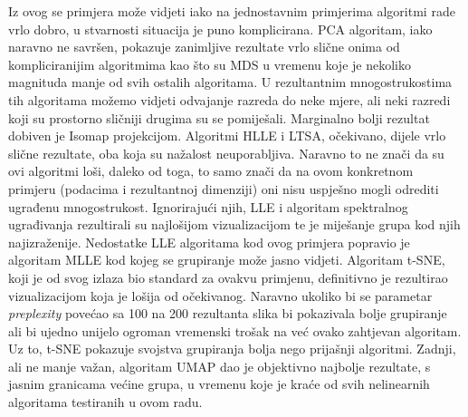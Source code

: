 \documentclass[times, utf8, diplomski]{fer}
\begin{document}
Iz ovog se primjera može vidjeti iako na jednostavnim primjerima algoritmi rade vrlo dobro, u stvarnosti situacija je puno komplicirana. PCA algoritam, iako naravno ne savršen, pokazuje zanimljive rezultate vrlo slične onima od kompliciranijim algoritmima kao što su MDS u vremenu koje je nekoliko magnituda manje od svih ostalih algoritama. U rezultantnim mnogostrukostima tih algoritama možemo vidjeti odvajanje razreda do neke mjere, ali neki razredi koji su prostorno sličniji drugima su se pomiješali. Marginalno bolji rezultat dobiven je Isomap projekcijom. Algoritmi HLLE i LTSA, očekivano, dijele vrlo slične rezultate, oba koja su nažalost neuporabljiva. Naravno to ne znači da su ovi algoritmi loši, daleko od toga, to samo znači da na ovom konkretnom primjeru (podacima i rezultantnoj dimenziji) oni nisu uspješno mogli odrediti ugrađenu mnogostrukost. Ignorirajući njih, LLE i algoritam spektralnog ugrađivanja rezultirali su najlošijom vizualizacijom te je miješanje grupa kod njih najizraženije. Nedostatke LLE algoritama kod ovog primjera popravio je algoritam MLLE kod kojeg se grupiranje može jasno vidjeti. Algoritam t-SNE, koji je od svog izlaza bio standard za ovakvu primjenu, definitivno je rezultirao vizualizacijom koja je lošija od očekivanog. Naravno ukoliko bi se parametar \emph{preplexity} povećao sa 100 na 200 rezultanta slika bi pokazivala bolje grupiranje ali bi ujedno unijelo ogroman vremenski trošak na već ovako zahtjevan algoritam. Uz to, t-SNE pokazuje svojstva grupiranja bolja nego prijašnji algoritmi. Zadnji, ali ne manje važan, algoritam UMAP dao je objektivno najbolje rezultate, s jasnim granicama većine grupa, u vremenu koje je kraće od svih nelinearnih algoritama testiranih u ovom radu.

\bigskip
{}
\end{document}
